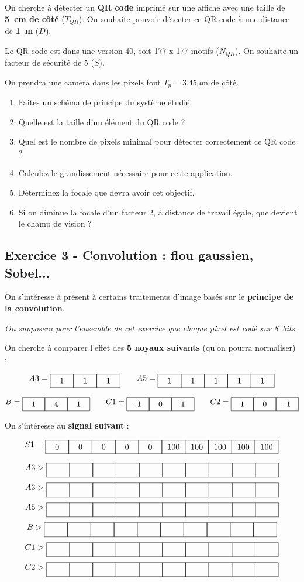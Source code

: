 \documentclass[a4paper,11pt,twoside]{book} %
\newcommand{\signal}[1]{ 
	\begin{tikzpicture}[baseline=(current bounding box.center)] \foreach \val [count=\i] in {#1} { \draw (\i-1,0) rectangle (\i,0.6); \node at (\i-.5,.3) {\val}; } \end{tikzpicture} }
\newcommand{\kernel}[1]{ 
	\begin{tikzpicture}[baseline=(current bounding box.center)] \foreach \val [count=\i] in {#1} { \draw (\i-1,0) rectangle (\i,0.6); \node at (\i-.5,.3) {\val}; } \end{tikzpicture} 
	}
\begin{document}
On cherche à détecter un \textbf{QR code} imprimé sur une affiche avec une taille de \textbf{5~cm de côté} ($T_{QR}$). On souhaite pouvoir détecter ce QR code à une distance de \textbf{1~m} ($D$).

Le QR code est dans une version 40, soit 177 x 177 motifs ($N_{QR}$). On souhaite un facteur de sécurité de 5 ($S$).

On prendra une caméra dans les pixels font $T_p = 3.45\operatorname{\mu{}m}$ de côté.

\begin{enumerate}
	\item Faites un schéma de principe du système étudié.
	\item Quelle est la taille d'un élément du QR code ?
	\item Quel est le nombre de pixels minimal pour détecter correctement ce QR code ?
	\item Calculez le grandissement nécessaire pour cette application.
	\item Déterminez la focale que devra avoir cet objectif.
	\item Si on diminue la focale d'un facteur 2, à distance de travail égale, que devient le champ de vision ?
\end{enumerate}


\subsection{Exercice 3 - Convolution : flou gaussien, Sobel...}

On s'intéresse à présent à certains traitements d'image basés sur le \textbf{principe de la convolution}.

\textit{On supposera pour l'ensemble de cet exercice que chaque pixel est codé sur 8~bits.}

On cherche à comparer l'effet des \textbf{5 noyaux suivants} (qu'on pourra normaliser) :

$$ A3 = \kernel{1,1,1} \qquad A5 = \kernel{1,1,1,1,1} $$

$$ B = \kernel{1,4,1} \qquad C1 = \kernel{-1,0,1} \qquad C2 = \kernel{1,0,-1} $$

\bigskip

On s'intéresse au \textbf{signal suivant} :

$$ S1 = \signal{0, 0, 0, 0, 0, 100, 100, 100, 100, 100} $$

$$ A3 > \signal{ , , , , , , , , , } $$
$$ A3 > \signal{ , , , , , , , , , } $$
$$ A5 > \signal{ , , , , , , , , , } $$
$$ B > \signal{ , , , , , , , , , } $$
$$ C1 > \signal{ , , , , , , , , , } $$
$$ C2 > \signal{ , , , , , , , , , } $$
\end{document}
